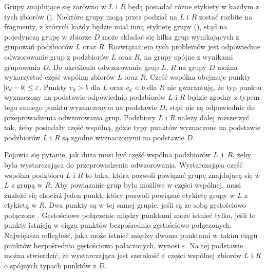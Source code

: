 Grupy znajdujące się zarówno w $ L $ i $ R $ będą posiadać różne etykiety w każdym z tych zbiorów (). Niektóre grupy mogą przez podział na $ L $ i $ R $ zostać rozbite na fragmenty, z których każdy będzie miał inną etykietę grupy (), stąd na pojedynczą grupę w zbiorze $ D $ może składać się kilka grup wynikających z grupowań podzbiorów $ L $ oraz $ R $. Rozwiązaniem tych problemów jest odpowiednie odwzorowanie grup z podzbiorów $ L $ oraz $ R $, na grupy spójne z wynikami grupowania $ D $. Do określenia odwzorowania grup $ L $, $ R $ na grupy $ D $ można wykorzystać część wspólną zbiorów $ L $ oraz $ R $. Część wspólna obejmuje punkty $ \abs{v_d - b} \le \varepsilon $. Punkty $ v_d > b $ dla $ L $ oraz $ v_d < b $ dla $ R $ nie gwarantuję, że typ punktu wyznaczony na podstawie odpowiednio podzbiorów $ L $ i $ R $ będzie zgodny z typem tego samego punktu wyznaczonym na podstawie $ D $, stąd nie są odpowiednie do przeprowadzenia odwzorowania grup. Podzbiory $ L $ i $ R $ należy dalej rozszerzyć tak, żeby posiadały część wspólną, gdzie typy punktów wyznaczone na podstawie podzbiorów $ L $ i $ R $ są zgodne wyznaczonymi na podstawie $ D $.

Pojawia się pytanie, jak duża musi być część wspólna podzbiorów \mbox{$ L $ i $ R $}, żeby była wystarczająca do przeprowadzenia odwzorowania. Wystarczająca część wspólna podzbioru $ L $ i $ R $ to taka, która pozwoli powiązać grupę znajdującą się w $ L $ z grupą w $ R $. Aby powiązanie grup było możliwe w części wspólnej, musi znaleźć się chociaż jeden punkt, który pozwoli powiązać etykietę grupy w $ L $ z etykietą w $ R $. Dwa punkty są w tej samej grupie, jeśli są ze sobą gęstościowo połączone \cite{dbscan}. Gęstościowe połączenie między punktami może istnieć tylko, jeśli te punkty istnieją w ciągu punktów bezpośrednio gęstościowo połączonych. Największa odległość, jaka może istnieć między dwoma punktami w takim ciągu punktów bezpośrednio gęstościowo połaczonych, wynosi $ \varepsilon $. Na tej podstawie można stwierdzić, że wystarczająca jest szerokość $ \varepsilon $ części wspólnej zbiorów $ L $ i $ R $ o spójnych typach punktów z $ D $.\par

